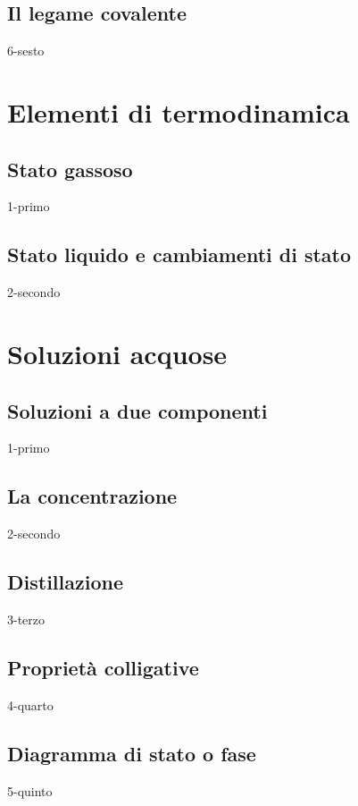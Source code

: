 \documentclass[openany,12pt]{book}%
\begin{document}
{\newpage

\section{Il legame covalente}
{6-sesto}

\chapter{Elementi di termodinamica}

\section{Stato gassoso}
{1-primo}

\section{Stato liquido e cambiamenti di stato}
{2-secondo}

\chapter{Soluzioni acquose}

\section{Soluzioni a due componenti}
{1-primo}

\section{La concentrazione}
{2-secondo}

\section{Distillazione}
{3-terzo}

\section{Proprietà colligative}
{4-quarto}

\newpage

\section{Diagramma di stato o fase}
{5-quinto}

}
\end{document}
